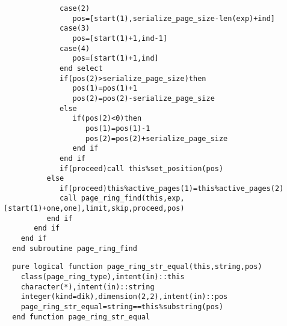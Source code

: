 \begin{Verbatim}
             case(2)
                pos=[start(1),serialize_page_size-len(exp)+ind]
             case(3)
                pos=[start(1)+1,ind-1]
             case(4)
                pos=[start(1)+1,ind]
             end select
             if(pos(2)>serialize_page_size)then
                pos(1)=pos(1)+1
                pos(2)=pos(2)-serialize_page_size
             else
                if(pos(2)<0)then
                   pos(1)=pos(1)-1
                   pos(2)=pos(2)+serialize_page_size
                end if
             end if
             if(proceed)call this%set_position(pos)
          else
             if(proceed)this%active_pages(1)=this%active_pages(2)
             call page_ring_find(this,exp,[start(1)+one,one],limit,skip,proceed,pos)
          end if
       end if
    end if
  end subroutine page_ring_find
\end{Verbatim}

\begin{Verbatim}
  pure logical function page_ring_str_equal(this,string,pos)
    class(page_ring_type),intent(in)::this
    character(*),intent(in)::string
    integer(kind=dik),dimension(2,2),intent(in)::pos
    page_ring_str_equal=string==this%substring(pos)
  end function page_ring_str_equal
\end{Verbatim}

